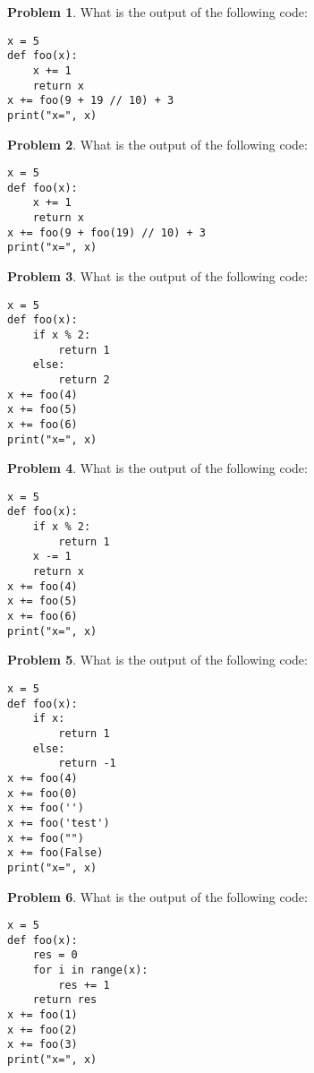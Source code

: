 \documentclass[10pt]{article}
\theoremstyle{definition}
\newtheorem{problem}{Problem}
\begin{document}
\begin{problem}
    What is the output of the following code:
\end{problem}
\begin{lstlisting}
x = 5
def foo(x):
    x += 1
    return x
x += foo(9 + 19 // 10) + 3
print("x=", x)
\end{lstlisting}
\vspace{2in}


\begin{problem}
    What is the output of the following code:
\end{problem}
\begin{lstlisting}
x = 5
def foo(x):
    x += 1
    return x
x += foo(9 + foo(19) // 10) + 3
print("x=", x)
\end{lstlisting}
\vspace{2in}



\newpage
\begin{problem}
    What is the output of the following code:
\end{problem}
\begin{lstlisting}
x = 5
def foo(x):
    if x % 2:
        return 1
    else:
        return 2
x += foo(4)
x += foo(5)
x += foo(6)
print("x=", x)
\end{lstlisting}
\vspace{2in}


\begin{problem}
    What is the output of the following code:
\end{problem}
\begin{lstlisting}
x = 5
def foo(x):
    if x % 2:
        return 1
    x -= 1
    return x
x += foo(4)
x += foo(5)
x += foo(6)
print("x=", x)
\end{lstlisting}
\vspace{2in}


\newpage
\begin{problem}
    What is the output of the following code:
\end{problem}
\begin{lstlisting}
x = 5
def foo(x):
    if x:
        return 1
    else:
        return -1
x += foo(4)
x += foo(0)
x += foo('')
x += foo('test')
x += foo("")
x += foo(False)
print("x=", x)
\end{lstlisting}
\vspace{2in}


\begin{problem}
    What is the output of the following code:
\end{problem}
\begin{lstlisting}
x = 5
def foo(x):
    res = 0
    for i in range(x):
        res += 1
    return res
x += foo(1)
x += foo(2)
x += foo(3)
print("x=", x)
\end{lstlisting}
\vspace{2in}
\end{document}
